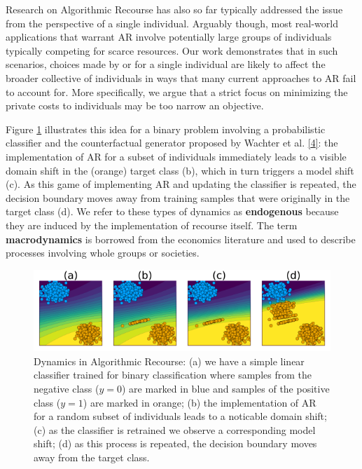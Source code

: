 \documentclass[conference,final,]{IEEEtran}
\theoremstyle{definition}
\theoremstyle{definition}
\theoremstyle{definition}
\theoremstyle{definition}
\theoremstyle{remark}
\begin{document}
Research on Algorithmic Recourse has also so far typically addressed the issue from the perspective of a single individual. Arguably though, most real-world applications that warrant AR involve potentially large groups of individuals typically competing for scarce resources. Our work demonstrates that in such scenarios, choices made by or for a single individual are likely to affect the broader collective of individuals in ways that many current approaches to AR fail to account for. More specifically, we argue that a strict focus on minimizing the private costs to individuals may be too narrow an objective.

Figure \ref{fig:poc} illustrates this idea for a binary problem involving a probabilistic classifier and the counterfactual generator proposed by Wachter et al. \protect\hyperlink{ref-wachter2017counterfactual}{{[}4{]}}: the implementation of AR for a subset of individuals immediately leads to a visible domain shift in the (orange) target class (b), which in turn triggers a model shift (c). As this game of implementing AR and updating the classifier is repeated, the decision boundary moves away from training samples that were originally in the target class (d). We refer to these types of dynamics as \textbf{endogenous} because they are induced by the implementation of recourse itself. The term \textbf{macrodynamics} is borrowed from the economics literature and used to describe processes involving whole groups or societies.

\begin{figure}

{\centering \includegraphics[width=0.9\linewidth]{www/poc} 

}

\caption{Dynamics in Algorithmic Recourse: (a) we have a simple linear classifier trained for binary classification where samples from the negative class ($y=0$) are marked in blue and samples of the positive class ($y=1$) are marked in orange; (b) the implementation of AR for a random subset of individuals leads to a noticable domain shift; (c) as the classifier is retrained we observe a corresponding model shift; (d) as this process is repeated, the decision boundary moves away from the target class.}\label{fig:poc}
\end{figure}
\end{document}
